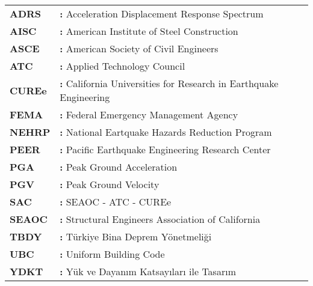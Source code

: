 \hspace{-3mm} %
\begin{tabular}{p{2cm}l}
\textbf{ADRS} & \textbf{:} Acceleration Displacement Response Spectrum\tabularnewline
\textbf{AISC} & \textbf{:} American Institute of Steel Construction\tabularnewline
\textbf{ASCE} & \textbf{:} American Society of Civil Engineers \tabularnewline
\textbf{ATC} & \textbf{:} Applied Technology Council \tabularnewline
\textbf{CUREe} & \textbf{:} California Universities for Research in Earthquake Engineering\tabularnewline
\textbf{FEMA}  & \textbf{:} Federal Emergency Management Agency \tabularnewline
\textbf{NEHRP} & \textbf{:} National Eartquake Hazards Reduction Program \tabularnewline
\textbf{PEER}  & \textbf{:} Pacific Earthquake Engineering Research Center \tabularnewline
\textbf{PGA}  & \textbf{:} Peak Ground Acceleration \tabularnewline
\textbf{PGV}  & \textbf{:} Peak Ground Velocity \tabularnewline
\textbf{SAC} & \textbf{:} SEAOC - ATC - CUREe\tabularnewline
\textbf{SEAOC} & \textbf{:} Structural Engineers Association of California\tabularnewline
\textbf{TBDY}  & \textbf{:} Türkiye Bina Deprem Yönetmeliği \tabularnewline
\textbf{UBC} & \textbf{:} Uniform Building Code\tabularnewline
\textbf{YDKT} & \textbf{:} Yük ve Dayanım Katsayıları ile Tasarım\tabularnewline
\end{tabular}
